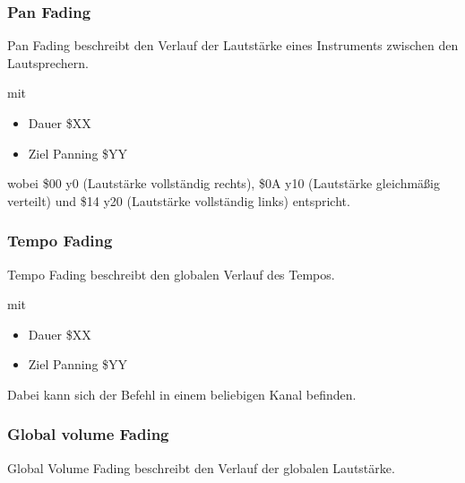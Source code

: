 \subsubsection{Pan Fading}

Pan Fading beschreibt den Verlauf der Lautstärke eines Instruments zwischen den Lautsprechern.

\medskip



\medskip

mit 

\begin{itemize}
	\item Dauer \$XX 
	\item Ziel Panning \$YY
\end{itemize}

wobei \$00 y0 (Lautstärke vollständig rechts), \$0A y10 (Lautstärke gleichmäßig verteilt) und \$14 y20 (Lautstärke vollständig links) entspricht.

\subsubsection{Tempo Fading}

Tempo Fading beschreibt den globalen Verlauf des Tempos.

\medskip



\medskip

mit 

\begin{itemize}
	\item Dauer \$XX 
	\item Ziel Panning \$YY
\end{itemize}

Dabei kann sich der Befehl in einem beliebigen Kanal befinden.

\subsubsection{Global volume Fading}

Global Volume Fading beschreibt den Verlauf der globalen Lautstärke.

\medskip



